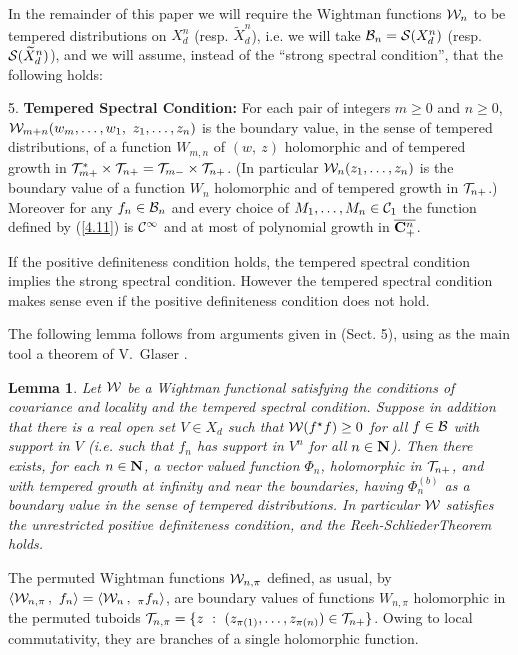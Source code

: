 \documentclass[a4paper,a4paper]{article}
\newtheorem{lemma}{Lemma}[section]
\def\bN{{\bf N}}
\def\bCp{{\bf C}_+}
\def\BB{{\cal B}}
\def\CC{{\cal C}}
\def\SS{{\cal S}}
\def\TT{{\cal T}}
\def\WW{{\cal W}}
\def\wt{\widetilde}
\def\ovl{\overline}
\def\Xdn{X_d^n}
\def\wXdn{{\wt X_d^n}}
\begin{document}
In the remainder of this paper we will require the Wightman functions $\WW_n$
to be tempered distributions on $\Xdn$ (resp. $\wXdn$), i.e.
we will take $\BB_n = \SS(\Xdn)$ (resp. $\SS(\wXdn)$), and we will assume,
instead of the ``strong spectral condition'', that
the following holds:

\begin{description}
\item{5.} {\bf Tempered Spectral Condition:}
For each pair of integers $m \ge 0$ and $n \ge 0$,\hfill\break
$\WW_{m+n}(w_m,\ldots,w_1,\ z_1,\ldots,z_n)$ is the boundary value,
in the sense of tempered distributions,
of a function $W_{m,n}$ of $(w,\ z)$ holomorphic and of tempered growth in
$\TT_{m+}^*\times\TT_{n+} = \TT_{m-}\times\TT_{n+}$.
(In particular
$\WW_{n}(z_1,\ldots,z_n)$ is the boundary value
of a function $W_n$ holomorphic and of tempered growth in $\TT_{n+}$.)
Moreover for any
$f_n \in \BB_n$ and every choice of $M_1,\ldots,M_n \in \CC_1$ the function
defined by (\ref{4.11}) is $\CC^\infty$ and at most of polynomial
growth in $\ovl{\bCp^n}$.
\end{description}

If the positive definiteness condition holds, the tempered spectral
condition implies the strong spectral condition. However the
tempered spectral condition makes sense even if the positive definiteness
condition does not hold.

The following lemma follows from arguments given in \cite{BEM} (Sect. 5),
using as the main tool a theorem of V.~Glaser \cite{G1}.

\begin{lemma}
\label{locpos}
Let $\WW$ be a Wightman functional satisfying the conditions of
covariance and locality and the tempered spectral condition.
Suppose in addition that there is a real open set $V \in X_d$ such that
$\WW(f^\star f) \ge 0$ for all $f \in \BB$ with support in
$V$ (i.e. such that $f_n$ has support in $V^n$ for all $n\in \bN$).
Then there exists, for each $n \in \bN$, a vector valued
function $\Phi_n$, holomorphic in $\TT_{n+}$, and with tempered
growth at infinity and near the boundaries, having
$\Phi_n^{(b)}$ as a boundary value in the sense of tempered
distributions. In particular $\WW$ satisfies the unrestricted
positive definiteness condition, and the Reeh-SchliederTheorem
holds.
\end{lemma}

The permuted Wightman functions $\WW_{n,\pi}$ defined, as usual, by
$\langle \WW_{n,\pi}\,,\ f_n \rangle =\linebreak[0]
\langle \WW_n\,,\linebreak[0]\ _\pi f_n\rangle$,
are boundary values of functions $W_{n,\pi}$ holomorphic in the
permuted tuboids
$\TT_{n,\pi} = \{z\ :\ (z_{\pi(1)},\ldots, z_{\pi(n)}) \in \TT_{n+}\}$.
Owing to local commutativity, they are branches of a single
holomorphic function.
\end{document}
